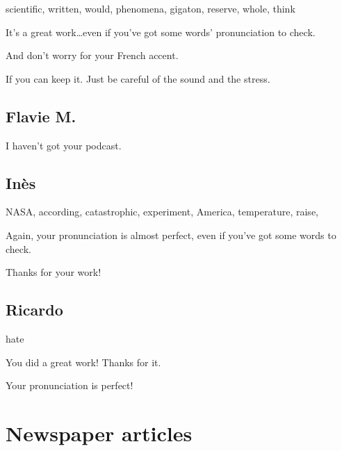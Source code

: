 \documentclass[12pt,oneside]{report}
\begin{document}
\begin{spacing}{1.2}
scientific, written, would, phenomena, gigaton, reserve, whole, think

\color{blue}
It's a great work\dots even if you've got some words' pronunciation to check.

And don't worry for your French accent.

If you can keep it. Just be careful of the sound and the stress.
\color{black}

\subsection*{Flavie M.}

\color{blue}
I haven't got your podcast.
\color{black}

\subsection*{Inès}

NASA, according, catastrophic, experiment, America, temperature, raise, 

\color{blue}
Again, your pronunciation is almost perfect, even if you've got some words to check.

Thanks for your work!
\color{black}

\subsection*{Ricardo}

hate

\color{blue}
You did a great work! Thanks for it.

Your pronunciation is perfect!
\color{black}



\section{Newspaper articles}






\end{spacing}
\end{document}
